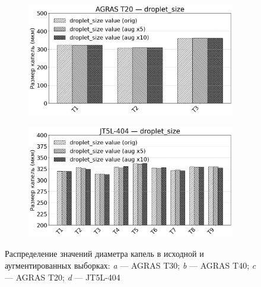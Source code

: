 \begin{figure}[htbp]
\begin{minipage}{0.95\linewidth}
\begin{subfigure}[t]{\dimexpr.5\linewidth-1.3em\relax}
		\centering
		\includegraphics[width=.95\linewidth,valign=t]{my_folder/images/augment/droplet_deposition/T20-droplet-size.png}
	\end{subfigure}%
	\hfill %
	\begin{subfigure}[t]{\dimexpr.5\linewidth-1.3em\relax}
		\centering
		\includegraphics[width=.95\linewidth,valign=t]{my_folder/images/augment/coffee_science/JT5-droplet-size.png}
	\end{subfigure}
	\end{minipage}
	\captionsetup{justification=centering} %
	\caption{Распределение значений диаметра капель в исходной и аугментированных выборках: {\itshape a} --- AGRAS T30; {\itshape b} --- AGRAS T40; {\itshape c} --- AGRAS T20; {\itshape d} --- JT5L-404} 
	\label{fig:augment-droplet-size}
\end{figure}